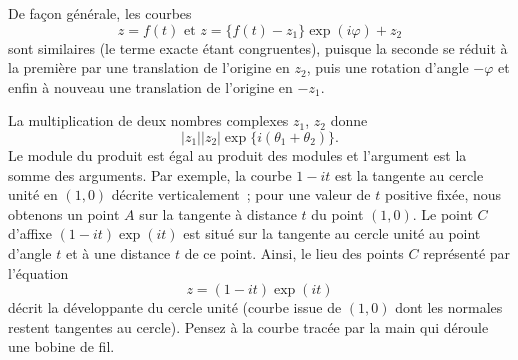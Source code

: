De façon générale, les courbes 
$$z=f(t) \text{ et } z=\{f(t)-z_1\}\exp(i \varphi) + z_2$$
sont similaires (le terme exacte étant congruentes), puisque la seconde se réduit à la première par une translation de l'origine en $z_2$, puis une rotation d'angle $-\varphi$ et enfin à nouveau une translation de l'origine en $-z_1$.   

La multiplication de deux nombres complexes $z_1$, $z_2$ donne
$$|z_1||z_2| \exp\{i(\theta_1+\theta_2)\}.$$
Le module du produit est égal au produit des modules et l'argument est la somme des arguments. Par exemple, la courbe $1-i t$ est la tangente au cercle unité en $(1,0)$ décrite verticalement~; pour une valeur de $t$ positive fixée, nous obtenons un point $A$ sur la tangente à distance $t$ du point $(1,0)$. Le point $C$ d'affixe $(1-it) \exp(it)$ est situé sur la tangente au cercle unité au point d'angle $t$ et à une distance $t$ de ce point. Ainsi, le lieu des points $C$ représenté par l'équation
$$z=(1-i t)\exp(it)$$
décrit la développante du cercle unité (courbe issue de $(1,0)$ dont les normales restent tangentes au cercle). Pensez à la courbe tracée par la main qui déroule une bobine de fil.

